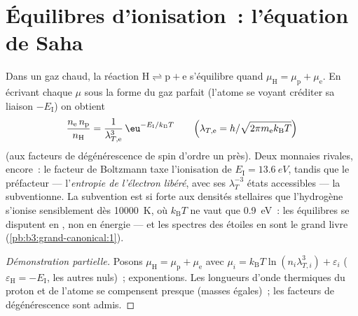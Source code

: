 \section{Équilibres d'ionisation~: l'équation de Saha}

\begin{proposition}\label{prop:b3:grand-canonical:saha}
Dans un gaz chaud, la réaction $\text{H} \rightleftharpoons \text{p} +
\text{e}$ s'équilibre quand $\mu_{\text{H}} = \mu_{\text{p}} +
\mu_{\text{e}}$. En écrivant chaque $\mu$ sous la forme du gaz parfait
(l'atome se voyant créditer sa liaison $-E_{\text{I}}$) on obtient
\[
\frac{n_{\text{e}}\,n_{\text{p}}}{n_{\text{H}}}
 = \frac{1}{\lambda_{T,\text{e}}^3}\,
\eu^{-E_{\text{I}}/k_{\text{B}}T}
\qquad\Big(\lambda_{T,\text{e}} =
h/\sqrt{2\pi m_{\text{e}}k_{\text{B}}T}\Big)
\]
(aux facteurs de dégénérescence de spin d'ordre un près). Deux
monnaies rivales, encore~: le facteur de Boltzmann taxe l'ionisation
de $E_{\text{I}} = \qty{13.6}{eV}$, tandis que le préfacteur ---
l'\emph{entropie de l'électron libéré}, avec ses $\lambda_T^{-3}$
états accessibles --- la subventionne. La subvention est si forte aux
densités stellaires que l'hydrogène s'ionise sensiblement dès
\qty{10000}{K}, où $k_{\text{B}}T$ ne vaut que \qty{0.9}{eV}~: les
équilibres se disputent en , non en énergie --- et les
spectres des étoiles en sont le grand livre
(\cref{pb:b3:grand-canonical:1}).
\end{proposition}

\begin{proof}[Démonstration partielle]
Posons $\mu_{\text{H}} = \mu_{\text{p}} + \mu_{\text{e}}$ avec $\mu_i
= k_{\text{B}}T\ln(n_i\lambda_{T,i}^3) + \varepsilon_i$
($\varepsilon_{\text{H}} = -E_{\text{I}}$, les autres nuls)~;
exponentions. Les longueurs d'onde thermiques du proton et de l'atome
se compensent presque (masses égales)~; les facteurs de dégénérescence
sont admis.
\end{proof}

